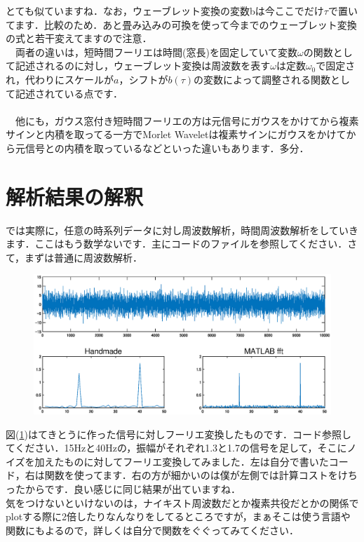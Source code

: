 \documentclass[11pt,a4paper]{ujreport} 	%
\begin{document}
とても似ていますね．なお，ウェーブレット変換の変数bは今ここでだけ$\tau$で置いてます．比較のため．あと畳み込みの可換を使って今までのウェーブレット変換の式と若干変えてますので注意．\\
　両者の違いは，短時間フーリエは時間(窓長)を固定していて変数$\omega$の関数として記述されるのに対し，ウェーブレット変換は周波数を表す$\omega$は定数$\omega_0$で固定され，代わりにスケールが$a$，シフトが$b(\tau)$の変数によって調整される関数として記述されている点です．\\
\\
　他にも，ガウス窓付き短時間フーリエの方は元信号にガウスをかけてから複素サインと内積を取ってる一方でMorlet Waveletは複素サインにガウスをかけてから元信号との内積を取っているなどといった違いもあります．多分．

\section{解析結果の解釈}
では実際に，任意の時系列データに対し周波数解析，時間周波数解析をしていきます．ここはもう数学ないです．主にコードのファイルを参照してください．さて，まずは普通に周波数解析．

\begin{figure}[H]
  \label{im:fft}
  \centering
  \includegraphics[width=12cm]{../figures/fft.eps}
\end{figure}

図(\ref{im:fft})はてきとうに作った信号に対しフーリエ変換したものです．コード参照してください．15Hzと40Hzの，振幅がそれぞれ1.3と1.7の信号を足して，そこにノイズを加えたものに対してフーリエ変換してみました．左は自分で書いたコード，右は関数を使ってます．右の方が細かいのは僕が左側では計算コストをけちったからです．良い感じに同じ結果が出ていますね．\\

気をつけないといけないのは，ナイキスト周波数だとか複素共役だとかの関係でplotする際に2倍したりなんなりをしてるところですが，まぁそこは使う言語や関数にもよるので，詳しくは自分で関数をぐぐってみてください．\\
\end{document}
